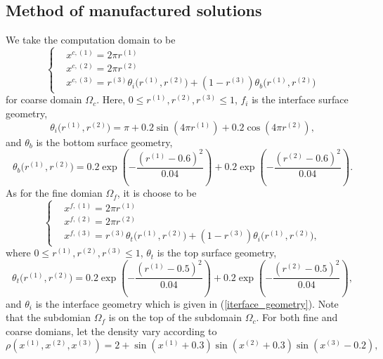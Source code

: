 \documentclass[a4paper]{article}
\begin{document}
\subsection{Method of manufactured solutions}\label{manufactured_sol}
We take the computation domain to be 
\begin{equation}\label{coarse_domain_manufactured}
 \left\{
\begin{aligned}
& x^{c,(1)} = 2\pi r^{(1)}\\
& x^{c,(2)} = 2\pi r^{(2)}\\
& x^{c,(3)} = r^{(3)}\theta_i\big(r^{(1)},r^{(2)}\big) + (1-r^{(3)})\theta_b\big(r^{(1)},r^{(2)}\big)
\end{aligned}
\right.
\end{equation}
for coarse domain $\Omega_c$. Here, $0\leq r^{(1)}, r^{(2)}, r^{(3)}\leq 1$, $f_i$ is the interface surface geometry,
\begin{equation}\label{iterface_geometry}
\theta_i\big(r^{(1)},r^{(2)}\big) = \pi+0.2\sin(4\pi r^{(1)})+0.2\cos(4\pi r^{(2)}),
\end{equation}
and 
$\theta_b$ is the bottom surface geometry,
\begin{equation}\label{bottom_geometry}
\theta_b\big(r^{(1)},r^{(2)}\big) = 0.2\exp\left(-\frac{(r^{(1)}-0.6)^2}{0.04}\right)+0.2\exp\left(-\frac{(r^{(2)}-0.6)^2}{0.04}\right).
\end{equation}
As for the fine domian $\Omega_f$, it is choose to be
\begin{equation}\label{fine_domain_manufactured}
\left\{
\begin{aligned}
& x^{f,(1)} = 2\pi r^{(1)}\\
& x^{f,(2)} = 2\pi r^{(2)}\\
& x^{f,(3)} = r^{(3)}\theta_t\big(r^{(1)},r^{(2)}\big) + (1-r^{(3)})\theta_i\big(r^{(1)},r^{(2)}\big),
\end{aligned}
\right.
\end{equation}
where $0\leq r^{(1)}, r^{(2)}, r^{(3)}\leq 1$, $\theta_t$ is the top surface geometry,
\begin{equation}\label{top_geometry}
\theta_t\big(r^{(1)},r^{(2)}\big) = 0.2\exp\left(-\frac{(r^{(1)}-0.5)^2}{0.04}\right)+0.2\exp\left(-\frac{(r^{(2)}-0.5)^2}{0.04}\right),
\end{equation}
and $\theta_i$ is the interface geometry which is given in (\ref{iterface_geometry}). Note that the subdomian 
$\Omega_f$ is on the top of the subdomain $\Omega_c$. For both fine and coarse domians, let the density vary according to
\begin{equation}\label{density_function}
\rho(x^{(1)},x^{(2)},x^{(3)}) = 2 + \sin(x^{(1)}+0.3)\sin(x^{(2)}+0.3)\sin(x^{(3)}-0.2),
\end{equation}
\end{document}
